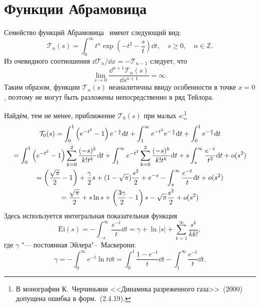 \section{Функции Абрамовица}\label{sec:Abramowitz}

Семейство функций Абрамовица~\cite{Cercignani2000} имеют следующий вид:
\begin{equation}\label{eq:Abramowitz}
    \mathcal{T}_n(s) = \int_0^\infty t^n \exp\left(-t^2-\frac{s}{t}\right) \dd t,
    \quad s\ge0, \quad n \in \mathbb{Z}.
\end{equation}
Из очевидного соотношения \(\dd \mathcal{T}_n/\dd x = -\mathcal{T}_{n-1}\) следует, что
\[
    \lim_{s\to0} \frac{\dd^{n+1} \mathcal{T}_n(s)}{\dd s^{n+1}} = \infty.
\]
Таким образом, функции \(\mathcal{T}_n(s)\) неаналитичны ввиду особенности в точке \(x=0\),
поэтому не могут быть разложены непосредственно в ряд Тейлора.

Найдём, тем не менее, приближение \(\mathcal{T}_0(s)\) при малых \(s\):\footnote{
    В монографии К.~Черчиньяни <<Динамика разреженного газа>>~(2000)~\cite{Cercignani2000}
    допущена ошибка в форм.~(2.4.19).
}
\begin{gather}
    \mathcal{T}_0(s) = \int_0^1 \left(e^{-t^2}-1\right) e^{-\frac{s}{t}} \mathrm{d}{t}
        + \int_1^\infty e^{-t^2} e^{-\frac{s}{t}} \mathrm{d}{t}
        + \int_0^1 e^{-\frac{s}{t}} \mathrm{d}{t} \notag\\
    = \int_0^1 \left(e^{-t^2}-1\right) \sum_{k=0}^2 \frac{(-s)^k}{k!t^k} \mathrm{d}{t}
        + \int_1^\infty e^{-t^2} \sum_{k=0}^2 \frac{(-s)^k}{k!t^k} \mathrm{d}{t}
        + s\int_s^\infty \frac{e^{-t}}{t^2} \mathrm{d}{t} + o(s^2) \notag\\
    = \left(\frac{\sqrt\pi}2-1\right)
        + \frac{\gamma}2 s
        + (1-\sqrt\pi) \frac{s^2}2
        + e^{-s} - \int_s^\infty\frac{e^{-t}}{t} \mathrm{d}{t} + o(s^2)  \notag\\
    = \frac{\sqrt\pi}2
        + s\ln{s} + \left(\frac{3\gamma}2 - 1\right) s
        - \sqrt\pi\frac{s^2}2 + o(s^2) \label{eq:Abramowitz0}
\end{gather}
Здесь используется интегральная показательная функция
\begin{equation}\label{eq:exp_integral}
    \mathrm{Ei}(s) = -\int_{-s}^\infty \frac{e^{-t}}{t} \dd{t}
        = \gamma + \ln|s| + \sum_{k=1}^{\infty} \frac{s^k}{kk!},
\end{equation}
где \(\gamma\) "--- постоянная Эйлера"--~Маскерони:
\begin{equation}\label{eq:euler-masceroni}
    \gamma = -\int_0^\infty e^{-t}\ln{t} \dd{t}
        = \int_0^1 \frac{1-e^{-t}}{t} \dd{t} - \int_1^\infty \frac{e^{-t}}{t} \dd{t}.
\end{equation}

